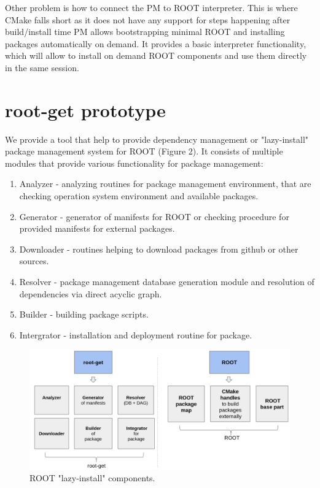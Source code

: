 \documentclass{webofc}
\begin{document}
Other problem is how to connect the PM to ROOT interpreter. This is where CMake falls short as it does not have any support for steps happening after build/install time PM allows bootstrapping minimal ROOT and installing packages automatically on demand. It provides a basic interpreter functionality,  which will allow to install on demand ROOT components and use them directly in the same session.

\section{root-get prototype}

We provide a tool that help to provide dependency management or "lazy-install" package management system for ROOT (Figure 2). It consists of multiple modules that provide various functionality for package management:
\begin{enumerate}
\item Analyzer - analyzing routines for package management environment, that are checking operation system environment and available packages.
\item Generator - generator of manifests for ROOT or checking procedure for provided manifests for external packages.
\item Downloader - routines helping to download packages from github or other sources.
\item Resolver - package management database generation module and resolution of dependencies via direct acyclic graph.
\item Builder - building package scripts.
\item Intergrator - installation and deployment routine for package. 
\end{enumerate}

\begin{figure}
\includegraphics[width=1.0\linewidth]{picture/3.png}
\caption{ROOT "lazy-install" components.}
\label{interp}
\end{figure}
\end{document}
